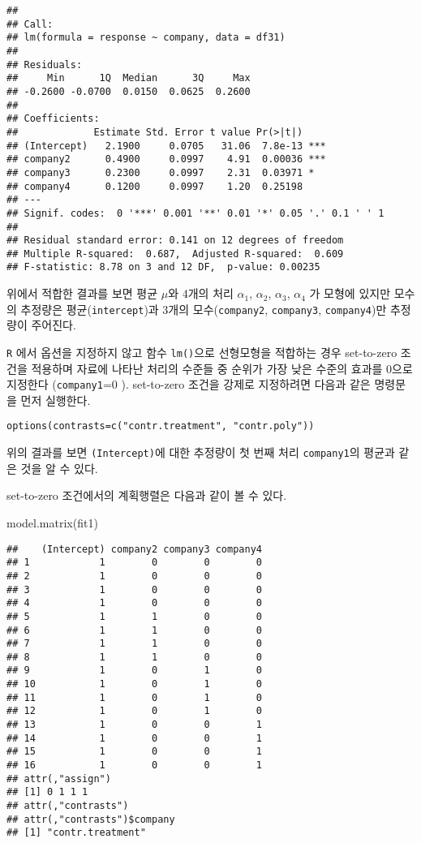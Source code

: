 \documentclass[
]{book}
\newenvironment{Shaded}{\begin{snugshade}}{\end{snugshade}}
\newcommand{\FunctionTok}[1]{\textcolor[rgb]{0.00,0.00,0.00}{#1}}
\newcommand{\NormalTok}[1]{#1}
\begin{document}
\begin{verbatim}
## 
## Call:
## lm(formula = response ~ company, data = df31)
## 
## Residuals:
##     Min      1Q  Median      3Q     Max 
## -0.2600 -0.0700  0.0150  0.0625  0.2600 
## 
## Coefficients:
##             Estimate Std. Error t value Pr(>|t|)    
## (Intercept)   2.1900     0.0705   31.06  7.8e-13 ***
## company2      0.4900     0.0997    4.91  0.00036 ***
## company3      0.2300     0.0997    2.31  0.03971 *  
## company4      0.1200     0.0997    1.20  0.25198    
## ---
## Signif. codes:  0 '***' 0.001 '**' 0.01 '*' 0.05 '.' 0.1 ' ' 1
## 
## Residual standard error: 0.141 on 12 degrees of freedom
## Multiple R-squared:  0.687,  Adjusted R-squared:  0.609 
## F-statistic: 8.78 on 3 and 12 DF,  p-value: 0.00235
\end{verbatim}

위에서 적합한 결과를 보면 평균 \(\mu\)와 4개의 처리 \(\alpha_1\),
\(\alpha_2\), \(\alpha_3\), \(\alpha_4\) 가 모형에 있지만 모수의 추정량은
평균(\texttt{intercept})과 3개의 모수(\texttt{company2}, \texttt{company3}, \texttt{company4})만
추정량이 주어진다.

\texttt{R} 에서 옵션을 지정하지 않고 함수 \texttt{lm()}으로 선형모형을 적합하는 경우 set-to-zero 조건을
적용하며 자료에 나타난 처리의 수준들 중 순위가 가장 낮은 수준의 효과를
0으로 지정한다 (\texttt{company1}=0 ). set-to-zero 조건을 강제로 지정하려면 다음과 같은 명령문을 먼저 실행한다.

\begin{verbatim}
options(contrasts=c("contr.treatment", "contr.poly"))
\end{verbatim}

위의 결과를 보면 \texttt{(Intercept)}에 대한 추정량이 첫 번째 처리 \texttt{company1}의
평균과 같은 것을 알 수 있다.

set-to-zero 조건에서의 계획행렬은 다음과 같이 볼 수 있다.

\begin{Shaded}
\begin{Highlighting}[]
\FunctionTok{model.matrix}\NormalTok{(fit1)}
\end{Highlighting}
\end{Shaded}

\begin{verbatim}
##    (Intercept) company2 company3 company4
## 1            1        0        0        0
## 2            1        0        0        0
## 3            1        0        0        0
## 4            1        0        0        0
## 5            1        1        0        0
## 6            1        1        0        0
## 7            1        1        0        0
## 8            1        1        0        0
## 9            1        0        1        0
## 10           1        0        1        0
## 11           1        0        1        0
## 12           1        0        1        0
## 13           1        0        0        1
## 14           1        0        0        1
## 15           1        0        0        1
## 16           1        0        0        1
## attr(,"assign")
## [1] 0 1 1 1
## attr(,"contrasts")
## attr(,"contrasts")$company
## [1] "contr.treatment"
\end{verbatim}
\end{document}
